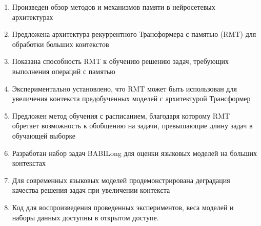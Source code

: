 \begin{enumerate}
  \item Произведен обзор методов и механизмов памяти в нейросетевых архитектурах
  \item Предложена архитектура рекуррентного Трансформера с памятью (RMT) для обработки больших контекстов
  \item Показана способность RMT к обучению решению задач, требующих выполнения операций с памятью
  \item Экспериментально установлено, что RMT может быть использован для увеличения контекста предобученных моделей с архитектурой Трансформер
  \item Предложен метод обучения с расписанием, благодаря которому RMT обретает возможность к обобщению на задачи, превышающие длину задач в обучающей выборке
  \item Разработан набор задач BABILong для оценки языковых моделей на больших контекстах
  \item Для современных языковых моделей продемонстрирована деградация качества решения задач при увеличении контекста
  \item Код для воспроизведения проведенных экспериментов, веса моделей и наборы данных доступны в открытом доступе.
\end{enumerate}



